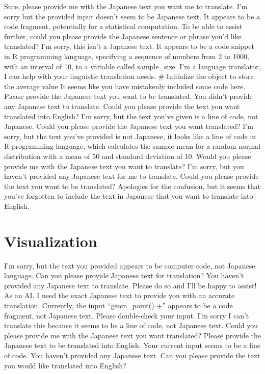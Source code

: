 \documentclass[
  a4paper,
]{book}
\begin{document}
Sure, please provide me with the Japanese text you want me to translate.
I'm sorry but the provided input doesn't seem to be Japanese text. It
appears to be a code fragment, potentially for a statistical
computation. To be able to assist further, could you please provide the
Japanese sentence or phrase you'd like translated? I'm sorry, this isn't
a Japanese text. It appears to be a code snippet in R programming
language, specifying a sequence of numbers from 2 to 1000, with an
interval of 10, to a variable called sample\_size. I'm a language
translator, I can help with your linguistic translation needs. \#
Initialize the object to store the average value It seems like you have
mistakenly included some code here. Please provide the Japanese text you
want to be translated. You didn't provide any Japanese text to
translate. Could you please provide the text you want translated into
English? I'm sorry, but the text you've given is a line of code, not
Japanese. Could you please provide the Japanese text you want
translated? I'm sorry, but the text you've provided is not Japanese, it
looks like a line of code in R programming language, which calculates
the sample mean for a random normal distribution with a mean of 50 and
standard deviation of 10. Would you please provide me with the Japanese
text you want to translate? I'm sorry, but you haven't provided any
Japanese text for me to translate. Could you please provide the text you
want to be translated? Apologies for the confusion, but it seems that
you've forgotten to include the text in Japanese that you want to
translate into English.


\chapter{Visualization}\label{visualization}

I'm sorry, but the text you provided appears to be computer code, not
Japanese language. Can you please provide Japanese text for translation?
You haven't provided any Japanese text to translate. Please do so and
I'll be happy to assist! As an AI, I need the exact Japanese text to
provide you with an accurate translation. Currently, the input
``geom\_point() +'' appears to be a code fragment, not Japanese text.
Please double-check your input. I'm sorry I can't translate this because
it seems to be a line of code, not Japanese text. Could you please
provide me with the Japanese text you want translated? Please provide
the Japanese text to be translated into English. Your current input
seems to be a line of code. You haven't provided any Japanese text. Can
you please provide the text you would like translated into English?
\end{document}

